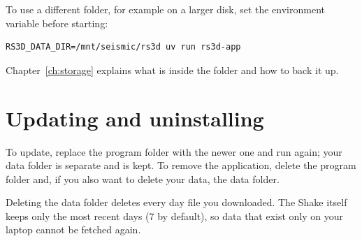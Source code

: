 To use a different folder, for example on a larger disk, set the environment variable  before starting:

\begin{verbatim}
RS3D_DATA_DIR=/mnt/seismic/rs3d uv run rs3d-app
\end{verbatim}

Chapter~\ref{ch:storage} explains what is inside the folder and how to back it up.

\section{Updating and uninstalling}
To update, replace the program folder with the newer one and run  again; your data folder is separate and is kept. To
remove the application, delete the program folder and, if you also want to delete your data, the data folder.

\begin{rs3dwarn}
Deleting the data folder deletes every day file you downloaded. The Shake itself keeps only the most recent days
(7 by default), so data that exist only on your laptop cannot be fetched again.
\end{rs3dwarn}
